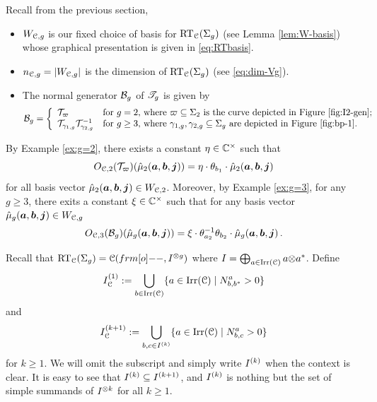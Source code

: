 \documentclass[11pt]{article}
\begin{document}
Recall from the previous section,
\begin{itemize}
\item 
$W_{\mathcal{C}, g}$ is our fixed choice of basis for $\operatorname{RT}_{\mathcal{C}}(\Sigma_{g})$ (see Lemma \ref{lem:W-basis}) whose graphical presentation is given in \eqref{eq:RTbasis}.

\item 
$n_{{\mathcal{C}}, {g}} = |W_{\mathcal{C}, g}|$ is the dimension of $\operatorname{RT}_{\mathcal{C}}(\Sigma_{g})$ (see \eqref{eq:dim-Vg}).

\item The normal generator $\db_g$ of $\mathscr{T}_{g}$ is given by
$$
\db_g = \left\{\begin{array}{ll}
    \dt_{\ITwoGen} & \text{for $g=2$,  where $\ITwoGen \subset \Sigma_2$ is the curve depicted in Figure \ref{fig:I2-gen};}   \\
    \dt_{\gamma_{1, g}}\dt^{-1}_{\gamma_{2, g}} &\text{for $g \ge 3$, where   $\gamma_{1,g}, \gamma_{2,g} \subset \Sigma_g$ are depicted in Figure \ref{fig:bp-1}}.
\end{array}\right.
$$
\end{itemize}

By Example \ref{ex:g=2}, there exists a constant $\eta \in {\mathbb{C}}^\times$ such that 
\begin{equation}\label{eq:g2-action}
\RTmat{\cC}{2}(\dt_{\ITwoGen})(\Wbase{2}{a}{b}{j}) = \eta \cdot \theta_{b_{1}}\cdot \Wbase{2}{a}{b}{j}
\end{equation}
for all basis vector ${\hat{\mu}_{2}(\bm{a}, \bm{b}, \bm{j})} \in W_{\mathcal{C}, 2}$. Moreover, by Example \ref{ex:g=3}, for any $g \ge 3$, there exits a constant $\xi \in {\mathbb{C}}^\times$ such that for any basis vector ${\hat{\mu}_{g}(\bm{a}, \bm{b}, \bm{j})} \in W_{\mathcal{C}, g}$
\begin{equation}\label{eq:g3-action}
\RTmat{\cC}{3}(\db_g)(\Wbase{g}{a}{b}{j}) = \xi \cdot \theta_{a_2}^{-1}\theta_{b_2} \cdot \Wbase{g}{a}{b}{j}\,.    
\end{equation}

Recall that $\RTspace{\cC}{g} = \cC(\1, I^{\ot g})$ where $I = \bigoplus_{a \in {\operatorname{Irr}}(\mathcal{C})} a {\otimes} a^*$. Define 
\begin{equation}
\label{eq:I1}
I^{(1)}_{\mathcal{C}} := \bigcup_{b \in {\operatorname{Irr}}({\mathcal{C}})}\{a \in {\operatorname{Irr}}({\mathcal{C}}) \mid N_{b, b^*}^{a} > 0\}
\end{equation}
and 
\[I^{(k+1)}_{\mathcal{C}} := \bigcup_{b, c \in I^{(k)}} \{a \in {\operatorname{Irr}}({\mathcal{C}}) \mid N_{b, c}^{a} > 0\} \]
for $k \ge 1$. We will omit the subscript and simply write $I^{(k)}$ when  the context is clear. It is easy to see that $I^{(k)} \subseteq I^{(k+1)}$, and $I^{(k)}$ is nothing but the set of simple summands of $I^{{\otimes} k}$ for all $k \ge 1$.
\end{document}
